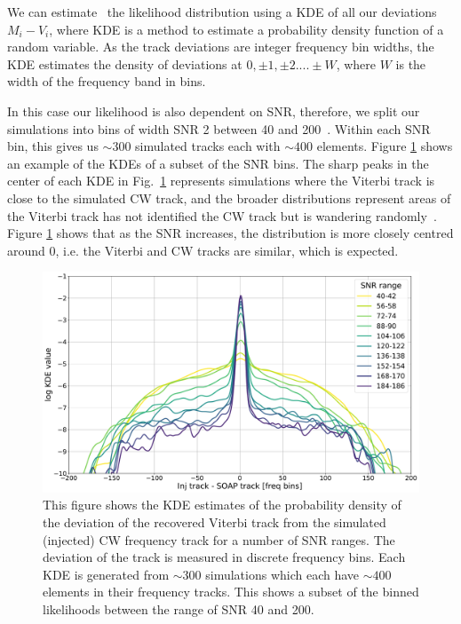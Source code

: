 We can estimate~ the likelihood distribution using a \gls{KDE} of
all our deviations $M_i - V_i$, where \gls{KDE} is a method to estimate a
probability density function of a random variable.  As the track deviations are
integer frequency bin widths, the \gls{KDE} estimates the density of deviations
at $0, \pm 1, \pm 2 .... \pm W$, where $W$ is the width of the frequency band
in bins.~

In this case our likelihood is also dependent on \gls{SNR}, therefore, we split
our simulations into bins of width \gls{SNR} 2 between 40 and 200~. Within each
\gls{SNR} bin, this gives us $\sim 300$ simulated tracks each with $\sim 400$
elements.  Figure \ref{par_est:bayes:likelihood:kde142} shows an example of the
\glspl{KDE} of a subset of the \gls{SNR} bins. The sharp peaks in the center of
each \gls{KDE} in Fig.~\ref{par_est:bayes:likelihood:kde142} represents
simulations where the Viterbi track is close to the simulated \gls{CW} track,
and the broader distributions represent areas of the Viterbi track has not
identified the \gls{CW} track but is wandering randomly~.
Figure \ref{par_est:bayes:likelihood:kde142} shows that as the \gls{SNR}
increases, the distribution is more closely centred around 0, i.e. the Viterbi
and \gls{CW} tracks are similar, which is expected.

%
\begin{figure}[ht]
    \centering
    \includegraphics[width=\linewidth]{C5_parameter/KDE_range_40_200.pdf}
    \caption[KDE of likelihood in different \gls{SNR} ranges]{This figure shows
the \gls{KDE} estimates of the probability density of the deviation of the recovered Viterbi track from
the simulated (injected) \gls{CW} frequency track for a number of \gls{SNR} ranges. The deviation of the track is
measured in discrete frequency bins. Each \gls{KDE} is generated from $\sim
300$ simulations which each have $\sim 400$ elements in their frequency tracks.
This shows a subset of the binned likelihoods between the range of \gls{SNR} 40
and 200.} \label{par_est:bayes:likelihood:kde142}
    \end{figure}
%

